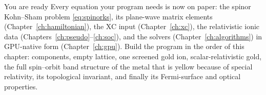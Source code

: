 \vspace{1em}
\begin{keybox}{You are ready}
Every equation your program needs is now on paper: the spinor Kohn--Sham
problem \eqref{eq:spinorks}, its plane-wave matrix elements
(Chapter~\ref{ch:hamiltonian}), the XC input (Chapter~\ref{ch:xc}), the
relativistic ionic data (Chapters~\ref{ch:pseudo}--\ref{ch:soc}), and the
solvers (Chapter~\ref{ch:algorithms}) in GPU-native form
(Chapter~\ref{ch:gpu}). Build the program in the order of this chapter:
components, empty lattice, one screened gold ion, scalar-relativistic
gold, the full spin--orbit band structure of the metal that is yellow
because of special relativity, its topological invariant, and finally
its Fermi-surface and optical properties.
\end{keybox}

